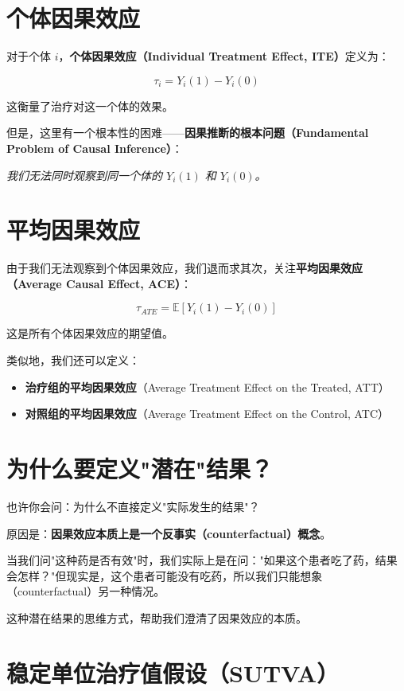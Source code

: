 \section{个体因果效应}

对于个体 $i$，\textbf{个体因果效应（Individual Treatment Effect, ITE）}定义为：

\[
\tau_i = Y_i(1) - Y_i(0)
\]

这衡量了治疗对这一个体的效果。

但是，这里有一个根本性的困难——\textbf{因果推断的根本问题（Fundamental Problem of Causal Inference）}：

\begin{center}
\textit{我们无法同时观察到同一个体的 $Y_i(1)$ 和 $Y_i(0)$。}
\end{center}

\section{平均因果效应}

由于我们无法观察到个体因果效应，我们退而求其次，关注\textbf{平均因果效应（Average Causal Effect, ACE）}：

\[
\tau_{ATE} = \mathbb{E}[Y_i(1) - Y_i(0)]
\]

这是所有个体因果效应的期望值。

类似地，我们还可以定义：
\begin{itemize}
  \item \textbf{治疗组的平均因果效应}（Average Treatment Effect on the Treated, ATT）
  \item \textbf{对照组的平均因果效应}（Average Treatment Effect on the Control, ATC）
\end{itemize}

\section{为什么要定义"潜在"结果？}

也许你会问：为什么不直接定义"实际发生的结果"？

原因是：\textbf{因果效应本质上是一个反事实（counterfactual）概念}。

当我们问"这种药是否有效"时，我们实际上是在问："如果这个患者吃了药，结果会怎样？"但现实是，这个患者可能没有吃药，所以我们只能想象（counterfactual）另一种情况。

这种潜在结果的思维方式，帮助我们澄清了因果效应的本质。

\section{稳定单位治疗值假设（SUTVA）}

